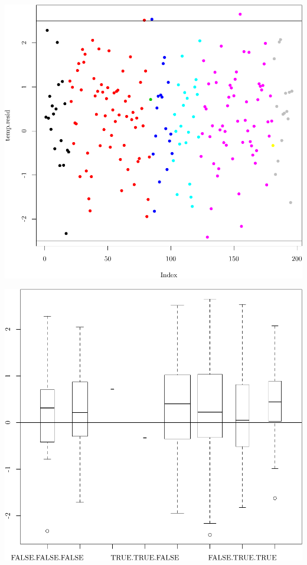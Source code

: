 \documentclass{article}
\begin{document}
\begin{knitrout}
{\centering \includegraphics[width=\maxwidth]{figure/05-eda-outliers-full-2} 

}


\begin{kframe}\begin{alltt}
\hlstd{(}  \hlstd{=} \hlstd{)} \hlopt{~} \hlopt{$} \hlopt{+} \hlopt{$} \hlopt{+} \hlopt{$}  \hlstd{=} \hlstd{)}
\hlstd{(} \hlstd{=} \hlstd{)}
\end{alltt}
\end{kframe}

{\centering \includegraphics[width=\maxwidth]{figure/05-eda-outliers-full-3} 

}
\end{knitrout}
\end{document}
